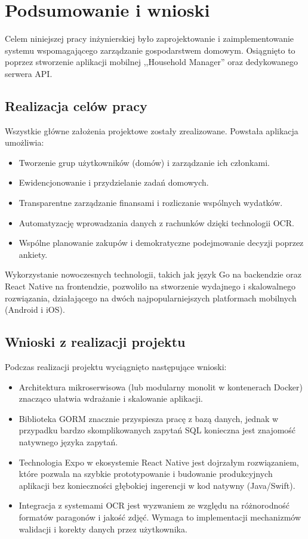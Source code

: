 \chapter{Podsumowanie i wnioski}
\label{rozdzial6}

Celem niniejszej pracy inżynierskiej było zaprojektowanie i zaimplementowanie systemu wspomagającego zarządzanie gospodarstwem domowym. Osiągnięto to poprzez stworzenie aplikacji mobilnej ,,Household Manager'' oraz dedykowanego serwera API.

\section{Realizacja celów pracy}

Wszystkie główne założenia projektowe zostały zrealizowane. Powstała aplikacja umożliwia:
\begin{itemize}
    \item Tworzenie grup użytkowników (domów) i zarządzanie ich członkami.
    \item Ewidencjonowanie i przydzielanie zadań domowych.
    \item Transparentne zarządzanie finansami i rozliczanie wspólnych wydatków.
    \item Automatyzację wprowadzania danych z rachunków dzięki technologii OCR.
    \item Wspólne planowanie zakupów i demokratyczne podejmowanie decyzji poprzez ankiety.
\end{itemize}

Wykorzystanie nowoczesnych technologii, takich jak język Go na backendzie oraz React Native na frontendzie, pozwoliło na stworzenie wydajnego i skalowalnego rozwiązania, działającego na dwóch najpopularniejszych platformach mobilnych (Android i iOS).

\section{Wnioski z realizacji projektu}

Podczas realizacji projektu wyciągnięto następujące wnioski:
\begin{itemize}
    \item Architektura mikroserwisowa (lub modularny monolit w kontenerach Docker) znacząco ułatwia wdrażanie i skalowanie aplikacji.
    \item Biblioteka GORM znacznie przyspiesza pracę z bazą danych, jednak w przypadku bardzo skomplikowanych zapytań SQL konieczna jest znajomość natywnego języka zapytań.
    \item Technologia Expo w ekosystemie React Native jest dojrzałym rozwiązaniem, które pozwala na szybkie prototypowanie i budowanie produkcyjnych aplikacji bez konieczności głębokiej ingerencji w kod natywny (Java/Swift).
    \item Integracja z systemami OCR jest wyzwaniem ze względu na różnorodność formatów paragonów i jakość zdjęć. Wymaga to implementacji mechanizmów walidacji i korekty danych przez użytkownika.
\end{itemize}

